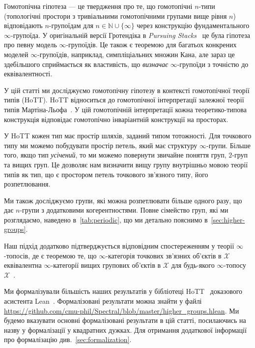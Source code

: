 \documentclass[12pt]{article}
\newcommand*{\bN}{{\mathbb{N}}}
\begin{document}
Гомотопічна гіпотеза — це твердження про те, що гомотопічні $n$-типи (топологічні простори з тривіальними гомотопічними групами вище рівня $n$) відповідають $n$-групоїдам для $n \in \bN \cup \{\infty\}$ через конструкцію фундаментального $\infty$-групоїда. У оригінальній версії Гротендіка в \emph{Pursuing Stacks}~\cite{Grothendieck1983} це була гіпотеза про певну модель $\infty$-групоїдів. Це також є теоремою для багатьох конкрених моделей $\infty$-групоїдів, наприклад, симпліціальних множин Кана, але зараз це здебільшого сприймається як властивість, що \emph{визначає} $\infty$-групоїди з точністю до еквівалентності.

У цій статті ми досліджуємо гомотопічну гіпотезу в контексті гомотопічної теорії типів (HoTT). HoTT відноситься до гомотопічної інтерпретації залежної теорії типів Мартіна-Льофа~\cite{AwodeyWarren2009,Voevodsky06}. У цій гомотопічній інтерпретації кожна теоретико-типова конструкція відповідає гомотопічно інваріантній конструкції на просторах.

У HoTT кожен тип має простір шляхів, заданий типом тотожності. Для точкового типу ми можемо побудувати простір петель, який має структуру $\infty$-групи. Більше того, якщо тип \emph{усічений}, то ми можемо повернути звичайне поняття груп, $2$-груп та вищих груп. Це дозволяє нам визначити вищу групу внутрішньо мовою теорії типів як тип, що є простором петель точкового зв'язного типу, його розпетлювання.

Ми також досліджуємо групи, які можна розпетлювати більше одного разу, що дає $n$-групи з додатковими когерентностями. Повне сімейство груп, які ми розглядаємо, наведено в~\autoref{tab:periodic}, що ми детально пояснимо в~\autoref{sec:higher-groups}.

Наш підхід додатково підтверджується відповідним спостереженням у теорії $\infty$-топосів, де є теоремою те, що $\infty$-категорія точкових зв'язних об'єктів в $\mathcal X$ еквівалентна $\infty$-категорії вищих групових об'єктів в $\mathcal X$ для будь-якого $\infty$-топосу $\mathcal X$~\cite[Лема~7.2.2.11(1)]{LurieHTT}.

Ми формалізували більшість наших результатів у бібліотеці HoTT~\cite{vDvRB2017HoTTLean} доказового асистента Lean~\cite{Moura2015}. Формалізовані результати можна знайти у файлі \url{https://github.com/cmu-phil/Spectral/blob/master/higher_groups.hlean}. Ми будемо вказувати основні формалізовані результати в цій статті, посилаючись на назву у формалізації у квадратних дужках. Для отримання додаткової інформації про формалізацію див.~\autoref{sec:formalization}.
\end{document}
